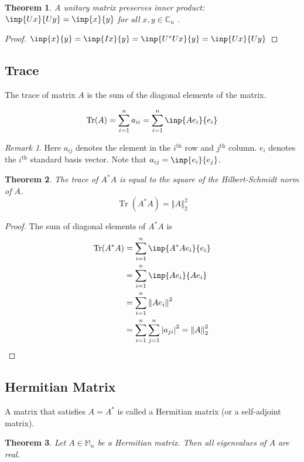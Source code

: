 \documentclass[twoside]{article}
\newcommand*\adj[1]{#1^*}
\newcommand*\norm[1]{\left \Vert #1 \right\Vert}
\newcommand*\abs[1]{\left \vert #1 \right\vert}
\DeclareMathOperator{\Tr}{Tr}
\theoremstyle{plain}
\newtheorem{theorem}{Theorem}
\theoremstyle{definition}
\theoremstyle{remark}
\newtheorem*{remark}{Remark}
\begin{document}
\begin{theorem} A unitary matrix preserves inner product: \(\inp{Ux}{Uy} = \inp{x}{y}\) for all  \(x, y \in \mathbb{C}_n\) . \end{theorem}

\begin{proof} \(\inp{x}{y} = \inp{Ix}{y} = \inp{\adj{U}U x}{y} = \inp{Ux}{Uy}\) \end{proof}

\subsection{Trace}
The trace of matrix \(A\) is the sum of the diagonal elements of the matrix.

\[\Tr(A) = \sum_{i=1} ^n a_{ii} = \sum_{i=1} ^n \inp{Ae_i}{ e_i}\]

\begin{remark}Here \(a_{ij}\) denotes the element in the \(i^{\text{th}}\) row and \(j^{\text{th}}\) column. \(e_i\) denotes the \(i^{\text{th}}\) standard basis vector. Note that \(a_{ij} = \inp{e_i}{e_j}\).\end{remark}

\begin{theorem}The trace of \(\adj{A}A\) is equal to the square of the Hilbert-Schmidt norm of \(A\). \[\Tr( \adj{A} A ) = \norm{A}_2^2\]\end{theorem}
\begin{proof}
The sum of diagonal elements of \(\adj{A} A\) is
 \begin{equation*} \begin{split} 
\Tr(\adj{A} A) & = \sum_{i=1}^n \inp{\adj{A}A e_i}{e_i} \\
 & = \sum_{i=1} ^n \inp{Ae_i}{Ae_i} \\
& = \sum_{i=1} ^n \norm{Ae_i}^2 \\
& = \sum_{i=1} ^n \sum_{j=1} ^n \abs{a_{ji}}^2  = \norm{A}^2_2
\end{split} \end{equation*}
 \end{proof}

\subsection{Hermitian Matrix}
A matrix that satisfies \(A = \adj{A}\) is called a Hermitian matrix (or a self-adjoint matrix). 

\begin{theorem} \label{herm_eig_real} Let \(A \in \mathbb{M}_n\) be a Hermitian matrix. Then all eigenvalues of \(A\) are real. \end{theorem}
\end{document}
